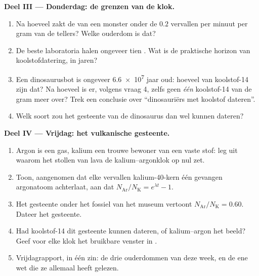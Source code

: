 \begin{problem}
\medskip
\noindent\textbf{Deel III --- Donderdag: de grenzen van de klok.}
\begin{enumerate}[resume]
  \item Na hoeveel  zakt de  van een monster onder de
        $0.2$ vervallen per minuut per gram van de tellers? Welke ouderdom is
        dat?
  \item De beste laboratoria halen ongeveer tien . Wat is de
        praktische horizon van koolstofdatering, in jaren?
  \item Een dinosaurusbot is ongeveer \num{6.6e7} jaar oud: hoeveel
         van koolstof-14 zijn dat? Na hoeveel 
        is er, volgens vraag 4, zelfs geen \emph{één}  koolstof-14 van de
        gram meer over? Trek een conclusie over ``dinosauriërs met koolstof
        dateren''.
  \item Welk soort  zou het gesteente van de dinosaurus dan wel kunnen
        dateren?
\end{enumerate}

\medskip
\noindent\textbf{Deel IV --- Vrijdag: het vulkanische gesteente.}
\begin{enumerate}[resume]
  \item Argon is een gas, kalium een trouwe bewoner van een vaste stof: leg uit
        waarom het stollen van lava de kalium--argonklok op nul zet.
  \item Toon, aangenomen dat elke vervallen kalium-40-kern één gevangen
        argonatoom achterlaat, aan dat
        $N_{\mathrm{Ar}}/N_{\mathrm K} = e^{\lambda t} - 1$.
  \item Het gesteente onder het fossiel van het museum vertoont
        $N_{\mathrm{Ar}}/N_{\mathrm K} = 0.60$. Dateer het gesteente.
  \item Had koolstof-14 dit gesteente kunnen dateren, of kalium--argon het
        beeld? Geef voor elke klok het bruikbare venster in .
  \item Vrijdagrapport, in één zin: de drie ouderdommen van deze week, en de
        ene wet die ze allemaal heeft gelezen.
\end{enumerate}
\end{problem}
